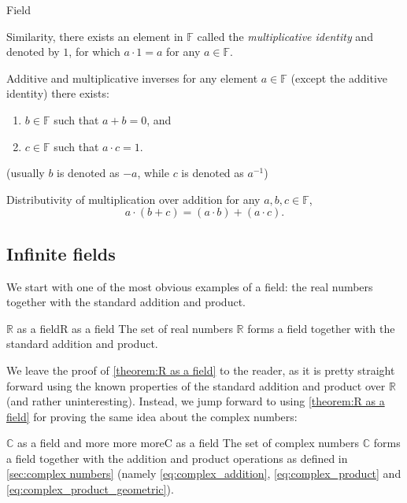 \begin{definition}{Field}{}
\begin{descitemize}
			Similarity, there exists an element in $\mathbb{F}$ called the \textit{multiplicative identity} and denoted by $1$, for which $a\cdot1=a$ for any $a\in\mathbb{F}$.

		\item[Additive and multiplicative inverses] for any element $a\in\mathbb{F}$ (except the additive identity) there exists:
			\begin{enumerate}
				\item $b\in\mathbb{F}$ such that $a+b=0$, and
				\item $c\in\mathbb{F}$ such that $a\cdot c=1$.
			\end{enumerate}
			(usually $b$ is denoted as $-a$, while $c$ is denoted as $a^{-1}$)

		\item[Distributivity of multiplication over addition] for any $a,b,c\in\mathbb{F}$,
			\[
				a\cdot(b+c) = (a\cdot b) + (a\cdot c).
			\]
	\end{descitemize}
\end{definition}

\subsection{Infinite fields}
We start with one of the most obvious examples of a field: the real numbers together with the standard addition and product.

\begin{theorem}{$\bm{\mathbb{R}}$ as a field}{R as a field}
	The set of real numbers $\mathbb{R}$ forms a field together with the standard addition and product.
\end{theorem}

We leave the proof of \autoref{theorem:R as a field} to the reader, as it is pretty straight forward using the known properties of the standard addition and product over $\mathbb{R}$ (and rather uninteresting). Instead, we jump forward to using \autoref{theorem:R as a field} for proving the same idea about the complex numbers:

\begin{theorem}{$\bm{\mathbb{C}}$ as a field and more more more}{C as a field}
	The set of complex numbers $\mathbb{C}$ forms a field together with the addition and product operations as defined in \autoref{sec:complex numbers} (namely \autoref{eq:complex_addition}, \autoref{eq:complex_product} and \autoref{eq:complex_product_geometric}).
\end{theorem}

